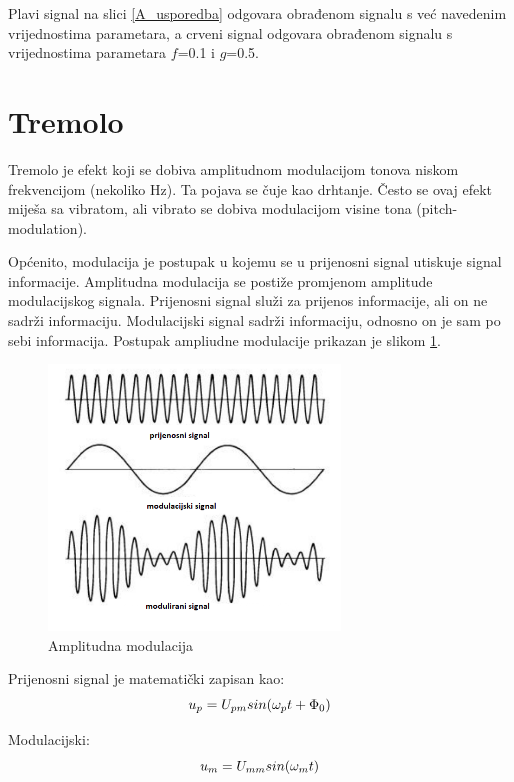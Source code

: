 \documentclass[conference]{IEEEtran}
\begin{document}
Plavi signal na slici \ref{A_usporedba} odgovara obrađenom signalu
s već navedenim vrijednostima parametara, a crveni signal odgovara obrađenom signalu s vrijednostima parametara
$f$=0.1 i $g$=0.5.


\section{Tremolo}
Tremolo je efekt koji se dobiva amplitudnom modulacijom tonova niskom frekvencijom (nekoliko Hz). Ta pojava se čuje
kao drhtanje. Često se ovaj efekt miješa sa vibratom, ali vibrato se dobiva modulacijom visine tona (pitch-modulation).

Općenito, modulacija je postupak u kojemu se u prijenosni signal utiskuje signal informacije. Amplitudna modulacija
se postiže promjenom amplitude modulacijskog signala. Prijenosni signal služi za prijenos informacije, ali on ne
sadrži informaciju. Modulacijski signal sadrži informaciju, odnosno on je sam po sebi informacija. Postupak ampliudne
 modulacije prikazan je slikom \ref{amp_mod}.

 \begin{figure}[H]
   \centerline{\includegraphics[height=200pt]{slike/amplitudna_modulacija.png}}
   \caption{Amplitudna modulacija}
   \label{amp_mod}
 \end{figure}

 Prijenosni signal je matematički zapisan kao:
\begin{equation}
  u_{p} = U_{pm}\*sin(\omega_{p}\*t+\Phi_{0})
  \label{mat_zapis}
\end{equation}

Modulacijski:
\begin{equation}
  u_{m} = U_{mm}\*sin(\omega_{m}\*t)
  \label{mod_zapis}
\end{equation}
\end{document}
